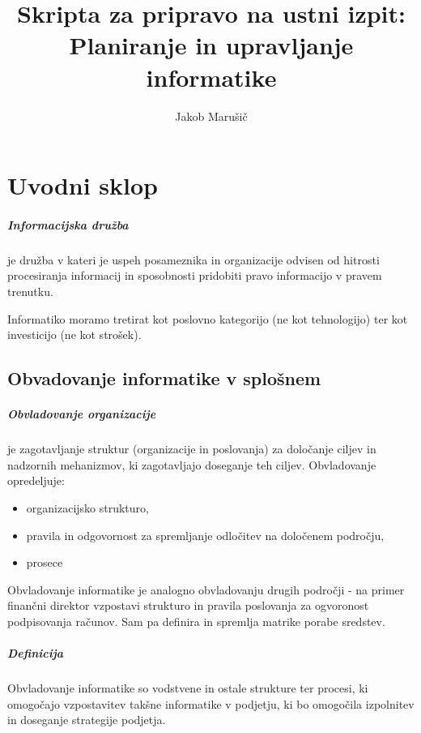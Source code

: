 \documentclass[a4paper,12pt]{report}
\begin{document}
\title{Skripta za pripravo na ustni izpit:\\Planiranje in upravljanje informatike}
\author{Jakob Marušič}

\maketitle

\chapter{Uvodni sklop}

\paragraph{Informacijska družba} je družba v kateri je uspeh posameznika in organizacije 
odvisen od hitrosti procesiranja informacij in sposobnosti pridobiti pravo informacijo v pravem trenutku.

Informatiko moramo tretirat kot poslovno kategorijo (ne kot tehnologijo) ter kot investicijo (ne kot strošek).

\section{Obvadovanje informatike v splošnem}

\paragraph{Obvladovanje organizacije} je zagotavljanje struktur (organizacije in poslovanja) za določanje ciljev in nadzornih mehanizmov, ki zagotavljajo doseganje teh ciljev. Obvladovanje opredeljuje:
   \begin{itemize}
      \item organizacijsko strukturo,
      \item pravila in odgovornost za spremljanje odločitev na določenem področju,
      \item prosece
   \end{itemize}

Obvladovanje informatike je analogno obvladovanju drugih področji - na primer finančni direktor vzpostavi strukturo in pravila poslovanja za ogvoronost podpisovanja računov. Sam pa definira in spremlja matrike porabe sredstev.

\paragraph{Definicija} Obvladovanje informatike so vodstvene in ostale strukture ter procesi, ki omogočajo vzpostavitev takšne informatike v podjetju, ki bo omogočila izpolnitev in doseganje strategije podjetja.
\end{document}
